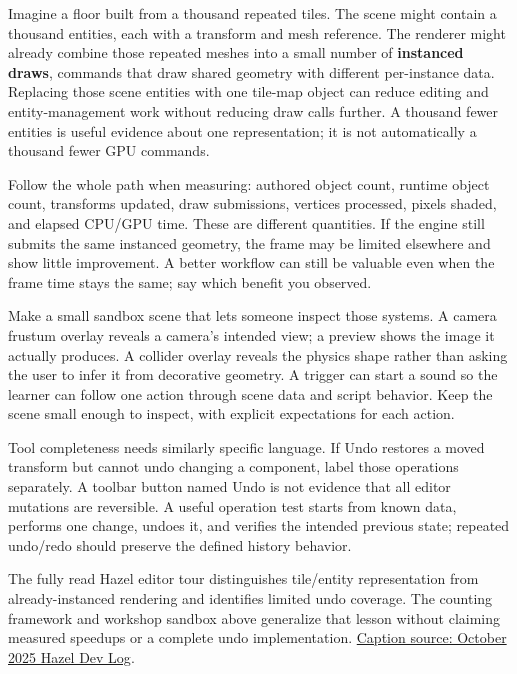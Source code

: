 \hypertarget{06-engine-ii-ch032-count-the-cost-you-actually-changed}{}

Imagine a floor built from a thousand repeated tiles. The scene might contain a thousand entities, each with a transform and mesh reference. The renderer might already combine those repeated meshes into a small number of \textbf{instanced draws}, commands that draw shared geometry with different per-instance data. Replacing those scene entities with one tile-map object can reduce editing and entity-management work without reducing draw calls further. A thousand fewer entities is useful evidence about one representation; it is not automatically a thousand fewer GPU commands.

Follow the whole path when measuring: authored object count, runtime object count, transforms updated, draw submissions, vertices processed, pixels shaded, and elapsed CPU/GPU time. These are different quantities. If the engine still submits the same instanced geometry, the frame may be limited elsewhere and show little improvement. A better workflow can still be valuable even when the frame time stays the same; say which benefit you observed.

Make a small sandbox scene that lets someone inspect those systems. A camera frustum overlay reveals a camera's intended view; a preview shows the image it actually produces. A collider overlay reveals the physics shape rather than asking the user to infer it from decorative geometry. A trigger can start a sound so the learner can follow one action through scene data and script behavior. Keep the scene small enough to inspect, with explicit expectations for each action.

Tool completeness needs similarly specific language. If Undo restores a moved transform but cannot undo changing a component, label those operations separately. A toolbar button named Undo is not evidence that all editor mutations are reversible. A useful operation test starts from known data, performs one change, undoes it, and verifies the intended previous state; repeated undo/redo should preserve the defined history behavior.

The fully read Hazel editor tour distinguishes tile/entity representation from already-instanced rendering and identifies limited undo coverage. The counting framework and workshop sandbox above generalize that lesson without claiming measured speedups or a complete undo implementation. \href{https://www.youtube.com/watch?v=-XT9R2P3I7M}{Caption source: October 2025 Hazel Dev Log}.

